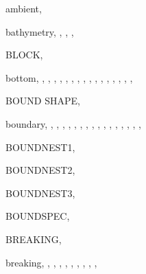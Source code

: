 \documentclass[12pt]{book}
\begin{document}
\begin{theindex}
  \item ambient, 

  \indexspace

  \item bathymetry, , , ,
  \item BLOCK, 
  \item bottom, , , ,
		, , ,
		, , ,
		, ,
		, , ,
		, , 
  \item BOUND SHAPE, 
  \item boundary, , , ,
		, , ,
		, , ,
		, , ,
		, , ,
		, 
  \item BOUNDNEST1, 
  \item BOUNDNEST2, 
  \item BOUNDNEST3, 
  \item BOUNDSPEC, 
  \item BREAKING, 
  \item breaking, , , ,
		, , ,
		, , ,

  \indexspace


\end{theindex}
\end{document}
